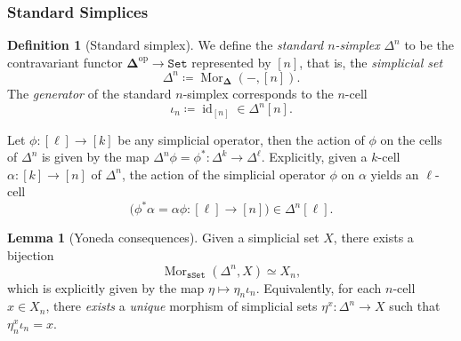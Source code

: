 \documentclass[11pt, reqno]{amsart}
\theoremstyle{definition}
\newtheorem{lemma}[theorem]{Lemma}
\newtheorem{definition}[theorem]{Definition}
\newcommand{\iso}{\simeq}
\newcommand{\arrowiso}{\iso}
\newcommand{\isoto}{\xrightarrow{\raisebox{-.6ex}[0ex][0ex]{\(\arrowiso\)}}}
\newcommand{\dis}{\iso}
\newcommand{\catfont}{\texttt}
\newcommand{\op}{\mathrm{op}}
\newcommand{\Set}{{\catfont{Set}}}          %
\DeclareMathOperator{\Hom}{Mor}   %
\DeclareMathOperator{\Id}{id}     %
\newcommand{\Splx}{{\mathbf{\Delta}}}           %
\newcommand{\sSet}{{\catfont{sSet}}}            %
\newcommand{\splx}{\Delta}
\newcommand{\disc}{\text{disc}}   %
\begin{document}

\subsubsection{Standard Simplices}

\begin{definition}[Standard simplex]
\label{def:standard-n-simplex}
We define the \emph{standard \(n\)-simplex} \(\splx^n\) to be the contravariant
functor \(\Splx^{\op} \to \Set\) represented by \([n]\), that is, the
\emph{simplicial set}
\[
\splx^n \coloneq \Hom_{\Splx}(-, [n]).
\]
The \emph{generator} of the standard \(n\)-simplex corresponds to the \(n\)-cell
\[
\iota_n \coloneq \Id_{[n]} \in \splx^n [n].
\]
\end{definition}

Let \(\phi: [\ell] \to [k]\) be any simplicial operator, then the action of
\(\phi\) on the cells of \(\splx^n\) is given by the map
\(\splx^n \phi = \phi^{*}: \splx^k \to \splx^{\ell}\). Explicitly, given a
\(k\)-cell \(\alpha: [k] \to [n]\) of \(\splx^n\), the action of the simplicial
operator \(\phi\) on \(\alpha\) yields an \(\ell\)-cell
\[
\big(\phi^{*} \alpha = \alpha \phi: [\ell] \longrightarrow [n]\big)
\in \splx^n[\ell].
\]

\begin{lemma}[Yoneda consequences]
\label{lem:yoneda-lemma-on-Splx-category}
Given a simplicial set \(X\), there exists a bijection
\[
\Hom_{\sSet}(\splx^n, X) \iso X_n,
\]
which is explicitly given by the map \(\eta \mapsto \eta_n
\iota_n\). Equivalently, for each \(n\)-cell \(x \in X_n\), there \emph{exists}
a \emph{unique} morphism of simplicial sets \(\eta^x: \splx^n \to X\) such that
\(\eta_n^x \iota_n = x\).
\end{lemma}
\end{document}
